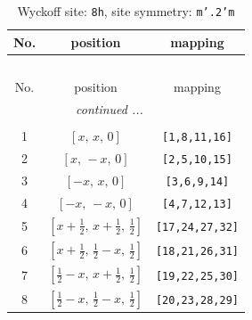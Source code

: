 \documentclass[fleqn,8pt]{jsarticle}
\begin{document}
\begin{longtable}{ccc}
\caption{Wyckoff site: {\tt 8h}, site symmetry: {\tt m'.2'm}}
 \\
 \hline \hline
No. & position & mapping \\ \hline \endfirsthead

\multicolumn{2}{l}{\tablename\ \thetable{}} \\
 \hline \hline
No. & position & mapping \\ \hline \endhead

 \hline \hline
\multicolumn{2}{r}{\footnotesize\it continued ...} \\ \endfoot

 \hline \hline
\multicolumn{2}{r}{} \\ \endlastfoot

1 & $\left[ x,\, x,\, 0 \right]$ & {\tt [1,8,11,16]} \\ \hline
2 & $\left[ x,\, - x,\, 0 \right]$ & {\tt [2,5,10,15]} \\ \hline
3 & $\left[ - x,\, x,\, 0 \right]$ & {\tt [3,6,9,14]} \\ \hline
4 & $\left[ - x,\, - x,\, 0 \right]$ & {\tt [4,7,12,13]} \\ \hline
5 & $\left[ x + \frac{1}{2},\, x + \frac{1}{2},\, \frac{1}{2} \right]$ & {\tt [17,24,27,32]} \\ \hline
6 & $\left[ x + \frac{1}{2},\, \frac{1}{2} - x,\, \frac{1}{2} \right]$ & {\tt [18,21,26,31]} \\ \hline
7 & $\left[ \frac{1}{2} - x,\, x + \frac{1}{2},\, \frac{1}{2} \right]$ & {\tt [19,22,25,30]} \\ \hline
8 & $\left[ \frac{1}{2} - x,\, \frac{1}{2} - x,\, \frac{1}{2} \right]$ & {\tt [20,23,28,29]} \\
\end{longtable}
\renewcommand{\arraystretch}{1.2}
\end{document}
